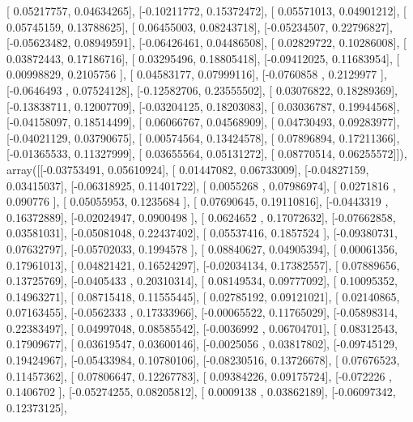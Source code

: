 \documentclass{article}
\begin{document}
       [ 0.05217757,  0.04634265],
       [-0.10211772,  0.15372472],
       [ 0.05571013,  0.04901212],
       [ 0.05745159,  0.13788625],
       [ 0.06455003,  0.08243718],
       [-0.05234507,  0.22796827],
       [-0.05623482,  0.08949591],
       [-0.06426461,  0.04486508],
       [ 0.02829722,  0.10286008],
       [ 0.03872443,  0.17186716],
       [ 0.03295496,  0.18805418],
       [-0.09412025,  0.11683954],
       [ 0.00998829,  0.2105756 ],
       [ 0.04583177,  0.07999116],
       [-0.0760858 ,  0.2129977 ],
       [-0.0646493 ,  0.07524128],
       [-0.12582706,  0.23555502],
       [ 0.03076822,  0.18289369],
       [-0.13838711,  0.12007709],
       [-0.03204125,  0.18203083],
       [ 0.03036787,  0.19944568],
       [-0.04158097,  0.18514499],
       [ 0.06066767,  0.04568909],
       [ 0.04730493,  0.09283977],
       [-0.04021129,  0.03790675],
       [ 0.00574564,  0.13424578],
       [ 0.07896894,  0.17211366],
       [-0.01365533,  0.11327999],
       [ 0.03655564,  0.05131272],
       [ 0.08770514,  0.06255572]]), array([[-0.03753491,  0.05610924],
       [ 0.01447082,  0.06733009],
       [-0.04827159,  0.03415037],
       [-0.06318925,  0.11401722],
       [ 0.0055268 ,  0.07986974],
       [ 0.0271816 ,  0.090776  ],
       [ 0.05055953,  0.1235684 ],
       [ 0.07690645,  0.19110816],
       [-0.0443319 ,  0.16372889],
       [-0.02024947,  0.0900498 ],
       [ 0.0624652 ,  0.17072632],
       [-0.07662858,  0.03581031],
       [-0.05081048,  0.22437402],
       [ 0.05537416,  0.1857524 ],
       [-0.09380731,  0.07632797],
       [-0.05702033,  0.1994578 ],
       [ 0.08840627,  0.04905394],
       [ 0.00061356,  0.17961013],
       [ 0.04821421,  0.16524297],
       [-0.02034134,  0.17382557],
       [ 0.07889656,  0.13725769],
       [-0.0405433 ,  0.20310314],
       [ 0.08149534,  0.09777092],
       [ 0.10095352,  0.14963271],
       [ 0.08715418,  0.11555445],
       [ 0.02785192,  0.09121021],
       [ 0.02140865,  0.07163455],
       [-0.0562333 ,  0.17333966],
       [-0.00065522,  0.11765029],
       [-0.05898314,  0.22383497],
       [ 0.04997048,  0.08585542],
       [-0.0036992 ,  0.06704701],
       [ 0.08312543,  0.17909677],
       [ 0.03619547,  0.03600146],
       [-0.0025056 ,  0.03817802],
       [-0.09745129,  0.19424967],
       [-0.05433984,  0.10780106],
       [-0.08230516,  0.13726678],
       [ 0.07676523,  0.11457362],
       [ 0.07806647,  0.12267783],
       [ 0.09384226,  0.09175724],
       [-0.072226  ,  0.1406702 ],
       [-0.05274255,  0.08205812],
       [ 0.0009138 ,  0.03862189],
       [-0.06097342,  0.12373125],
\end{document}
